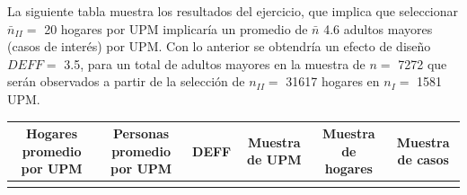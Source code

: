 \documentclass[12pt,spanish,]{book}
\begin{document}
La siguiente tabla muestra los resultados del ejercicio, que implica que seleccionar \(\bar{n}_{II} =\) 20 hogares por UPM implicaría un promedio de \(\bar{n}\) 4.6 adultos mayores (casos de interés) por UPM. Con lo anterior se obtendría un efecto de diseño \(DEFF =\) 3.5, para un total de adultos mayores en la muestra de \(n =\) 7272 que serán observados a partir de la selección de \(n_{II} =\) 31617 hogares en \(n_{I} =\) 1581 UPM.

\begin{longtable}[]{@{}cccccc@{}}
\toprule
\begin{minipage}[b]{0.16\columnwidth}\centering
Hogares promedio por UPM\strut
\end{minipage} & \begin{minipage}[b]{0.19\columnwidth}\centering
Personas promedio por UPM\strut
\end{minipage} & \begin{minipage}[b]{0.09\columnwidth}\centering
DEFF\strut
\end{minipage} & \begin{minipage}[b]{0.13\columnwidth}\centering
Muestra de UPM\strut
\end{minipage} & \begin{minipage}[b]{0.13\columnwidth}\centering
Muestra de hogares\strut
\end{minipage} & \begin{minipage}[b]{0.13\columnwidth}\centering
Muestra de casos\strut
\end{minipage}\tabularnewline
\midrule
\endhead
\begin{minipage}[t]{0.16\columnwidth}\centering
20\strut
\end{minipage} & \begin{minipage}[t]{0.19\columnwidth}\centering
4.6\strut
\end{minipage} & \begin{minipage}[t]{0.09\columnwidth}\centering
3.5\strut
\end{minipage} & \begin{minipage}[t]{0.13\columnwidth}\centering
1581\strut
\end{minipage} & \begin{minipage}[t]{0.13\columnwidth}\centering
31617\strut
\end{minipage} & \begin{minipage}[t]{0.13\columnwidth}\centering
7272\strut
\end{minipage}\tabularnewline
\bottomrule
\end{longtable}
\end{document}
